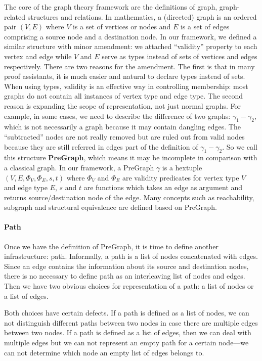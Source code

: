 The core of the graph theory framework are the definitions of graph,
graph-related structures and relations. In mathematics, a (directed)
graph is an ordered pair $(V, E)$ where $V$ is a set of vertices or
nodes and $E$ is a set of edges comprising a source node and a
destination node. In our framework, we defined a similar structure
with minor amendment: we attached ``validity'' property to each vertex
and edge while $V$ and $E$ serve as types instead of sets of vertices
and edges respectively. There are two reasons for the amendment. The
first is that in many proof assistants, it is much easier and natural
to declare types instead of sets. When using types, validity is an
effective way in controlling membership: most graphs do not contain
all instances of vertex type and edge type. The second reason is
expanding the scope of representation, not just normal graphs. For
example, in some cases, we need to describe the difference of two
graphs: $\gamma_1-\gamma_2$, which is not necessarily a graph because
it may contain dangling edges. The ``subtracted'' nodes are not really
removed but are ruled out from valid nodes because they are still
referred in edges part of the definition of $\gamma_1-\gamma_2$. So we
call this structure \textbf{PreGraph}, which means it may be
incomplete in comparison with a classical graph. In our framework, a
PreGraph $\gamma$ is a hextuple $(V, E, \Phi_V, \Phi_E, s, t)$ where
$\Phi_V$ and $\Phi_E$ are validity predicates for vertex type $V$ and
edge type $E$, $s$ and $t$ are functions which takes an edge as
argument and returns source/destination node of the edge. Many
concepts such as reachability, subgraph and structural equivalence are
defined based on PreGraph.

\paragraph{Path}
Once we have the definition of PreGraph, it is time to define another
infrastructure: path. Informally, a path is a list of nodes
concatenated with edges. Since an edge contains the information about
its source and destination nodes, there is no necessary to define path
as an interleaving list of nodes and edges. Then we have two obvious
choices for representation of a path: a list of nodes or a list of
edges.

Both choices have certain defects. If a path is defined as a list of
nodes, we can not distinguish different paths between two nodes in
case there are multiple edges between two nodes. If a path is defined
as a list of edges, then we can deal with multiple edges but we can
not represent an empty path for a certain node---we can not determine
which node an empty list of edges belongs to.

